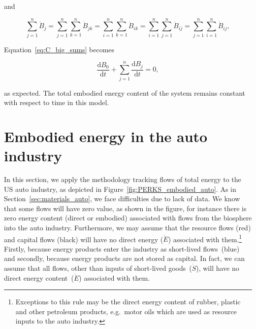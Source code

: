 \noindent{}and

\begin{equation} \label{eq:B_identity_2}
	\sum\limits_{j=1}^n\dot{B}_{j}  
	= \sum\limits_{j=1}^n \sum\limits_{k=1}^n \dot{B}_{jk}
	= \sum\limits_{i=1}^n \sum\limits_{k=1}^n \dot{B}_{ik}
	= \sum\limits_{i=1}^n \sum\limits_{j=1}^n \dot{B}_{ij}
	= \sum\limits_{j=1}^n \sum\limits_{i=1}^n \dot{B}_{ij},
\end{equation}

\noindent{}Equation~\ref{eq:C_big_sums} becomes

\begin{equation} \label{eq:C-B_sums_to_zero}
	\frac{\mathrm{d}B_{0}}{\mathrm{d}t} 
	+ \sum\limits_{j=1}^n \frac{\mathrm{d}B_{j}}{\mathrm{d}t} 
	= 0,
\end{equation}

\noindent{}as expected. The total embodied energy content of the system 
remains constant with respect to time in this model.


\section{Embodied energy in the auto industry}
\label{sec:embodied_energy_auto}


In this section,
we apply the methodology tracking flows of
total energy to the US auto industry,
as depicted in Figure~\ref{fig:PERKS_embodied_auto}.
As in Section~\ref{sec:materials_auto},
we face difficulties due to lack of data.
We know that some flows will have zero value,
as shown in the figure,
for instance there is zero energy content
(direct or embodied) associated with
flows from the biosphere into the auto industry.
Furthermore,
we may assume that the resource flows (red)
and capital flows (black) will have
no direct energy ($\dot{E}$)
associated with them.\footnote{Exceptions
to this rule may be the direct energy content
of rubber, plastic and other petroleum products,
e.g.\ motor oils which are used as resource
inputs to the auto industry.}
Firstly,
because energy products enter the industry 
as short-lived flows~(blue) and secondly,
because energy products are not stored
as capital.
In fact,
we can assume that all flows,
other than inputs of short-lived
goods~($\dot{S}$),
will have no direct energy content~($\dot{E}$) 
associated with them.

